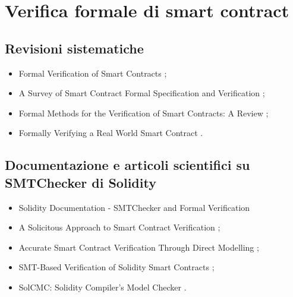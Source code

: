 \clearpage
{}
\section*{Verifica formale di smart contract}

\subsection*{Revisioni sistematiche}

\begin{itemize}

\item Formal Verification of Smart Contracts \cite{ethereum2024scfvreview};

\item A Survey of Smart Contract Formal Specification and Verification \cite{tolmach2021scfvreview};

\item Formal Methods for the Verification of Smart Contracts: A Review \cite{krichen2022scfvreview};

\item Formally Verifying a Real World Smart Contract \cite{mota2023scfvreview}.

\end{itemize}

\subsection*{Documentazione e articoli scientifici su SMTChecker di Solidity}

\begin{itemize}

\item Solidity Documentation - SMTChecker and Formal Verification \cite{solidity0.8.18smtchecker}

\item A Solicitous Approach to Smart Contract Verification \cite{otoni2023smtchecker};

\item Accurate Smart Contract Verification Through Direct Modelling \cite{marescotti2020smtchecker};

\item SMT-Based Verification of Solidity Smart Contracts \cite{alt2018smtchecker};

\item SolCMC: Solidity Compiler's Model Checker \cite{alt2022smtchecker}.

\end{itemize}

